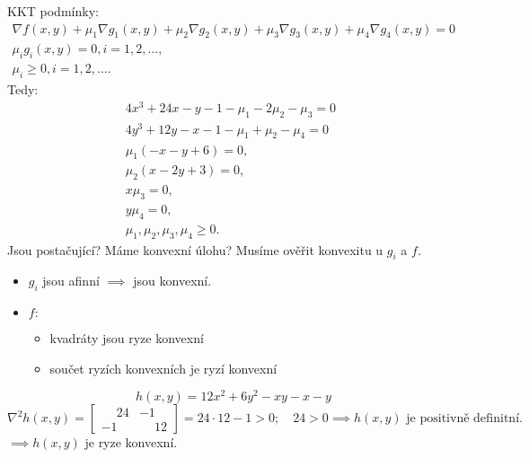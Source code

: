 KKT podmínky: 
\begin{align*}
    \nabla f(x, y) + \mu_1 \nabla g_1(x, y) + \mu_2 \nabla g_2(x, y) + \mu_3 \nabla g_3(x, y) + \mu_4 \nabla g_4(x, y) = 0 \\
    \mu_i g_i (x,y) = 0, i = 1,2,\dots,\\
    \mu_i \geq 0, i = 1,2,\dots.
\end{align*}
Tedy:
\begin{align*}
    4x^3 + 24x - y - 1 - \mu_1 - 2\mu_2 - \mu_3 = 0\phantom{,} \\
    4y^3 + 12y - x - 1 - \mu_1 + \mu_2 - \mu_4 = 0\phantom{,} \\
    \mu_1(-x-y+6) = 0, \\
    \mu_2(x-2y+3) = 0, \\
    x \mu_3 = 0, \\
    y \mu_4 = 0, \\
    \mu_1, \mu_2, \mu_3, \mu_4 \geq 0.
\end{align*}
Jsou postačující? Máme konvexní úlohu? Musíme ověřit konvexitu u $g_i$ a $f$.
\begin{itemize}
    \item $g_i$ jsou afinní $\implies$ jsou konvexní.
    \item $f:$
    \begin{itemize} %
        \item kvadráty jsou ryze konvexní
        \item součet ryzích konvexních je ryzí konvexní
    \end{itemize} 
\end{itemize}
\[h(x, y) = 12x^2 + 6y^2 - xy -x -y\]
\[
    \nabla^2 h (x, y) = 
    \begin{bmatrix}
        \phantom{-}24 & -1 \\
        -1 & \phantom{-}12
    \end{bmatrix} = 24 \cdot 12 - 1 > 0; \quad 24 > 0 \implies h(x, y)\text{ je positivně definitní.}
\]
$\implies h(x, y)$ je ryze konvexní.

